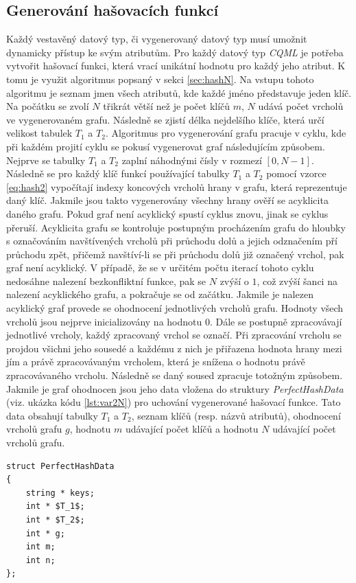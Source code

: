 \documentclass[11pt,twoside,a4paper]{book}
\begin{document}
{{\begin{ttemize}
{{\begin{lastlisting}[frame=single,caption=Řešení v pseudokódu problematického použití operátoru "." v přiřazovacím výroku,label=lst:var0N]
\subsection{\label{sec:hashN}Generování hašovacích funkcí}
Každý vestavěný datový typ, či vygenerovaný datový typ musí umožnit dynamicky přístup ke svým atributům.
Pro každý datový typ \textit{CQML} je potřeba vytvořit hašovací funkci, která vrací unikátní hodnotu pro každý jeho atribut. K tomu je využit algoritmus popsaný v sekci \ref{sec:hashN}. Na vstupu tohoto algoritmu je seznam jmen všech atributů, kde každé jméno představuje jeden klíč. Na počátku se zvolí $N$ třikrát větší než je počet klíčů $m$, $N$ udává počet vrcholů ve vygenerovaném grafu. Následně se zjistí délka nejdelšího klíče, která určí velikost tabulek $T_1$ a $T_2$. Algoritmus pro vygenerování grafu pracuje v cyklu, kde při každém projití cyklu se pokusí vygenerovat graf následujícím způsobem.
Nejprve se tabulky $T_1$ a $T_2$ zaplní náhodnými čísly v rozmezí $[0,N-1]$. Následně se pro každý klíč funkcí používající tabulky $T_1$ a $T_2$ pomocí vzorce \ref{eq:hash2} vypočítají indexy koncových vrcholů hrany v grafu, která reprezentuje daný klíč.
Jakmile jsou takto vygenerovány všechny hrany ověří se acyklicita daného grafu. Pokud graf není acyklický spustí cyklus znovu, jinak se cyklus přeruší. Acyklicita grafu se kontroluje postupným procházením grafu do hloubky s označováním navštívených vrcholů při průchodu dolů a jejich odznačením pří průchodu zpět, přičemž navštíví-li se při průchodu dolů již označený vrchol, pak graf není acyklický.
V případě, že se v určitém počtu iterací tohoto cyklu nedosáhne nalezení bezkonfliktní funkce, pak se $N$ zvýší o $1$, což zvýší šanci na nalezení acyklického grafu, a pokračuje se od začátku.
Jakmile je nalezen acyklický graf provede se ohodnocení jednotlivých vrcholů grafu. Hodnoty všech vrcholů jsou nejprve inicializovány na hodnotu $0$. Dále se postupně zpracovávají jednotlivé vrcholy, každý zpracovaný vrchol se označí. Při zpracování vrcholu se projdou všichni jeho sousedé a každému z nich je přiřazena hodnota hrany mezi jím a právě zpracovávaným vrcholem, která je snížena o hodnotu právě zpracovávaného vrcholu. Následně se daný soused zpracuje totožným způsobem. Jakmile je graf ohodnocen jsou jeho data vložena do struktury \textit{PerfectHashData} (viz. ukázka kódu \ref{lst:var2N}) pro uchování vygenerované hašovací funkce. Tato data obsahují tabulky $T_1$ a $T_2$, seznam klíčů (resp. názvů atributů), ohodnocení vrcholů grafu $g$, hodnotu $m$ udávající počet klíčů a hodnotu $N$ udávající počet vrcholů grafu.
\begin{lstlisting}[frame=single,caption=Struktura pro uchování hašovací funkce,label=lst:var2N]
struct PerfectHashData
{
	string * keys;
	int * $T_1$;
	int * $T_2$;
	int * g;
	int m;
	int n;
};
\end{lstlisting}


\end{lastlisting}}}
\end{ttemize}}}
\end{document}
